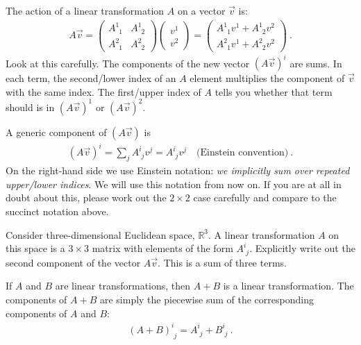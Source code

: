 The action of a linear transformation $A$ on a vector $\vec{v}$ is:
\begin{align}
  A\vec{v}
  =
  \begin{pmatrix}
    A^{1}_{\phantom{1}1} & A^{1}_{\phantom{1}2}
   \\
   A^{2}_{\phantom{2}1} & A^{2}_{\phantom{2}2}   
  \end{pmatrix} 
  \begin{pmatrix}
    v^1\\
    v^2
  \end{pmatrix}
  =
  \begin{pmatrix}
    A^1_{\phantom{1}1} v^1 + A^1_{\phantom{1}2}v^2\\
    A^2_{\phantom{2}1} v^1 + A^2_{\phantom{2}2}v^2
  \end{pmatrix} \ .
\end{align}
Look at this carefully. The components of the new vector $(A \vec{v})^i$ are sums. In each term, the second/lower index of an $A$ element multiplies the component of $\vec{v}$ with the same index. The first/upper index of $A$ tells you whether that term should is in $(A \vec{v})^1$ or $(A \vec{v})^2$. 

A generic component of $(A\vec{v})$ is
\begin{align}
  (A\vec{v})^i = \sum_j A^i_{\phantom{i}j} v^j
  = A^i_{\phantom{i}j} v^j \quad \text{(Einstein convention)}
   \ .
\end{align}
On the right-hand side we use Einstein notation: \emph{we implicitly sum over repeated upper/lower indices}. We will use this notation from now on.
%
If you are at all in doubt about this, please work out the $2\times 2$ case carefully and compare to the succinct notation above. 

\begin{exercise}
Consider three-dimensional Euclidean space, $\mathbb{R}^3$. A linear transformation $A$ on this space is a $3\times 3$ matrix with elements of the form $A^i_{\phantom{i}j}$. Explicitly write out the second component of the vector $A\vec{v}$. This is a sum of three terms.
\end{exercise}

If $A$ and $B$ are linear transformations, then $A+B$ is a linear transformation. The components of $A+B$ are simply the piecewise sum of the corresponding components of $A$ and $B$:
\begin{align}
  (A+B)^i_{\phantom i j} = A^i_{\phantom i j} + B ^i_{\phantom i j} \ .
\end{align}


